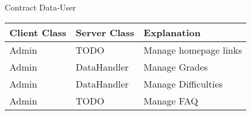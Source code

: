 \begin{subsubsection}{Contract Data-User}
	\begin{tabular}{l l l }
	  Client Class & Server Class & Explanation\\ \hline
	  Admin & TODO & Manage homepage links\\
		Admin & DataHandler & Manage Grades\\
		Admin & DataHandler & Manage Difficulties\\
		Admin & TODO & Manage FAQ
	\end{tabular}
\end{subsubsection}
